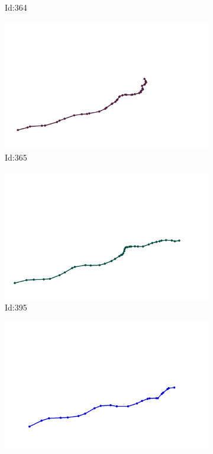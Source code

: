 \documentclass[12pt,twoside]{report}
\begin{document}
\begin{figure}
\begin{subfigure}[b]{0.20\textwidth}
\caption{Id:364}
\end{subfigure}
\begin{subfigure}[b]{0.20\textwidth}
\centering
\includegraphics[width=\textwidth]{../trajectories/365.png}
\caption{Id:365}
\end{subfigure}
\begin{subfigure}[b]{0.20\textwidth}
\centering
\includegraphics[width=\textwidth]{../trajectories/395.png}
\caption{Id:395}
\end{subfigure}
\begin{subfigure}[b]{0.20\textwidth}
\centering
\includegraphics[width=\textwidth]{../trajectories/438.png}

\end{subfigure}
\end{figure}
\end{document}
